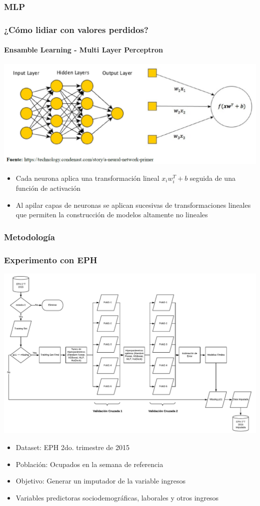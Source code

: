 \documentclass{beamer}
\begin{document}
\subsubsection{MLP}

\begin{frame}
\frametitle{¿Cómo lidiar con valores perdidos?}
\framesubtitle{Ensamble Learning - Multi Layer Perceptron}
\includegraphics[width=1\linewidth, height=0.5\textheight]{../img/mlp}
\begin{itemize}		
	\item Cada neurona aplica una transformación lineal  $x_{i}w_{i}^T+b$ seguida de una función de activación
	\item Al apilar capas de neuronas se aplican sucesivas de transformaciones lineales que permiten la construcción de modelos altamente no lineales
\end{itemize}
\end{frame}

\subsubsection{Metodología}
\begin{frame}
\frametitle{Experimento con EPH}
\includegraphics[width=0.99\linewidth, height=0.6\textheight]{../img/pipeline}
\begin{itemize}
	\item Dataset: EPH 2do. trimestre de 2015
	\item Población: Ocupados en la semana de referencia
	\item Objetivo: Generar un imputador de la variable ingresos
	\item Variables predictoras sociodemográficas, laborales y otros ingresos
\end{itemize}
\end{frame}
\end{document}
